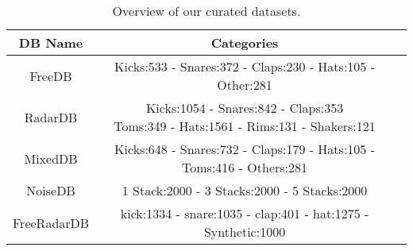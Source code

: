 \documentclass[\main/thesis.tex]{subfiles}
\begin{document}
\begin{table}[]
\begin{tabular}{ |c|c|c| } 
\hline
DB Name & Categories \\ \hline
FreeDB  & Kicks:533 - Snares:372 - Claps:230 - Hats:105 - Other:281            \\ \hline
RadarDB & \makecell{Kicks:1054 - Snares:842 - Claps:353 \\ Toms:349 - Hats:1561 - Rims:131 - Shakers:121} \\ \hline
MixedDB & Kicks:648 - Snares:732 - Claps:179 - Hats:105 - Toms:416 - Others:281                     \\ \hline
NoiseDB & 1 Stack:2000 - 3 Stacks:2000 - 5 Stacks:2000                         \\ \hline
 FreeRadarDB & kick:1334 - snare:1035 - clap:401 - hat:1275 - Synthetic:1000 \\ \hline
\end{tabular}
    \caption{Overview of our curated datasets.}
    \label{table:all_db}
\end{table}




\end{document}
